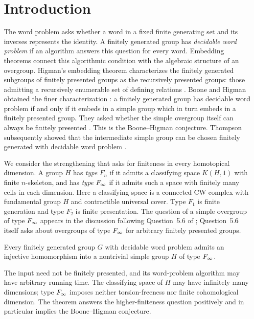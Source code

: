 \section{Introduction}\label{sec:introduction}

The word problem asks whether a word in a fixed finite generating set
and its inverses represents the identity. A finitely generated group has
\emph{decidable word problem} if an algorithm answers this question for
every word. Embedding theorems connect this algorithmic condition with
the algebraic structure of an overgroup. Higman's embedding theorem
characterizes the finitely generated subgroups of finitely presented
groups as the recursively presented groups: those admitting a
recursively enumerable set of defining relations \citep{Higman1961}.
Boone and Higman obtained the finer characterization
\citep[Theorem~I]{BH74}: a finitely generated group has decidable word
problem if and only if it embeds in a simple group which in turn embeds
in a finitely presented group. They asked whether the simple overgroup
itself can always be finitely presented \citep[p.~43]{BH74}.
This is the Boone--Higman conjecture. Thompson subsequently showed that
the intermediate simple group can be chosen finitely generated with
decidable word problem \citep{Tho80}.

We consider the strengthening that asks for finiteness in every
homotopical dimension. A group \(H\) has \emph{type \(F_n\)} if it admits a
classifying space \(K(H,1)\) with finite \(n\)-skeleton, and has
\emph{type \(F_\infty\)} if it admits such a space with finitely many
cells in each dimension. Here a classifying space is a connected CW
complex with fundamental group \(H\) and contractible universal cover.
Type \(F_1\) is finite generation and type \(F_2\) is finite
presentation. The question of a simple overgroup of type \(F_\infty\)
appears in
the discussion following Question~5.6 of \citet{BBMZsurvey};
Question~5.6 itself asks about overgroups of type \(F_\infty\) for
arbitrary finitely presented groups.

\begin{theorem}\label{thm:main}
Every finitely generated group \(G\) with decidable word problem admits
an injective homomorphism into a nontrivial simple group \(H\) of type
\(F_\infty\).
\end{theorem}

The input need not be finitely presented, and its word-problem
algorithm may have arbitrary running time. The classifying space of
\(H\) may have infinitely many dimensions; type \(F_\infty\) imposes
neither torsion-freeness nor finite cohomological dimension.
The theorem answers the higher-finiteness question positively and in
particular implies the Boone--Higman conjecture.

